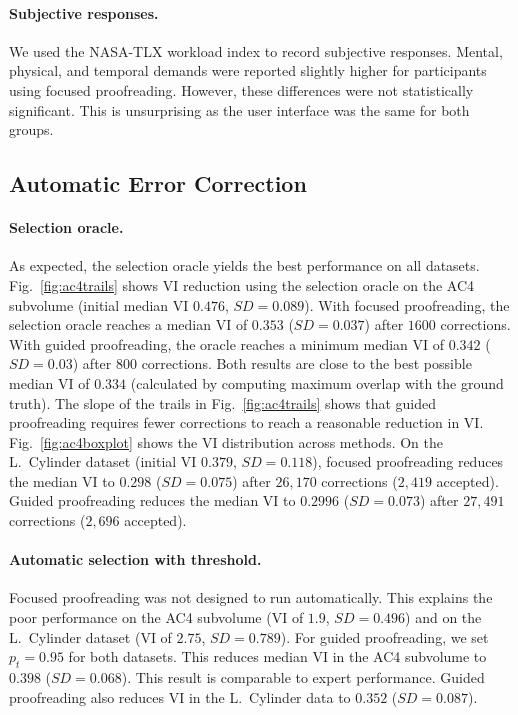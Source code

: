 \paragraph{Subjective responses.} We used the NASA-TLX workload index to record subjective responses. Mental, physical, and temporal demands were reported slightly higher for participants using focused proofreading. However, these differences were not statistically significant. This is unsurprising as the user interface was the same for both groups.


\subsection{Automatic Error Correction}

\paragraph{Selection oracle.} As expected, the selection oracle yields the best performance on all datasets. Fig.~\ref{fig:ac4trails} shows VI reduction using the selection oracle on the AC4 subvolume (initial median VI $0.476$, $SD=0.089$). With focused proofreading, the selection oracle reaches a median VI of $0.353$ ($SD=0.037$) after $1600$ corrections. With guided proofreading, the oracle reaches a minimum median VI of $0.342$ ($SD=0.03$) after $800$ corrections. Both results are close to the best possible median VI of $0.334$ (calculated by computing maximum overlap with the ground truth). The slope of the trails in Fig.~\ref{fig:ac4trails} shows that guided proofreading requires fewer corrections to reach a reasonable reduction in VI. Fig.~\ref{fig:ac4boxplot} shows the VI distribution across methods. On the L.~Cylinder dataset (initial VI $0.379$, $SD=0.118$), focused proofreading reduces the median VI to $0.298$ ($SD=0.075$) after $26,170$ corrections ($2,419$ accepted). Guided proofreading reduces the median VI to $0.2996$ ($SD=0.073$) after $27,491$ corrections ($2,696$ accepted).

\paragraph{Automatic selection with threshold.} Focused proofreading was not designed to run automatically. This explains the poor performance on the AC4 subvolume (VI of $1.9$, $SD=0.496$) and on the L.~Cylinder dataset (VI of $2.75$, $SD=0.789$). For guided proofreading, we set $p_t=0.95$ for both datasets. This reduces median VI in the AC4 subvolume to $0.398$ ($SD=0.068$). This result is comparable to expert performance. Guided proofreading also reduces VI in the L.~Cylinder data to $0.352$ ($SD=0.087$).

